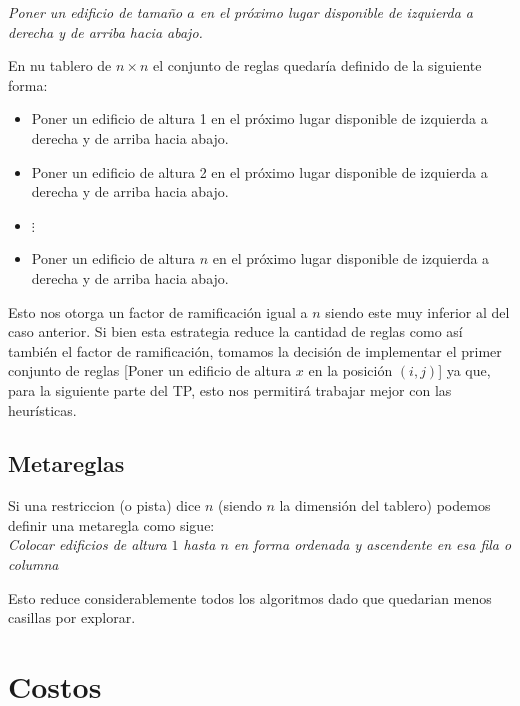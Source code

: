 \documentclass[%
	final,
	reprint,
	notitlepage,
	narroweqnarray,
	inline,
	twoside,
	invited
	]{ieee}
\begin{document}
\emph{Poner un edificio de tamaño $a$ en el próximo lugar disponible de izquierda a derecha y de arriba hacia abajo.}\\

\par En nu tablero de $n\times n$ el conjunto de reglas quedaría definido de la siguiente forma:\\

\begin{itemize}
\item Poner un edificio de altura 1 en el próximo lugar disponible de izquierda a derecha y de arriba hacia abajo.
\item Poner un edificio de altura 2 en el próximo lugar disponible de izquierda a derecha y de arriba hacia abajo.
\item $\vdots$
\item Poner un edificio de altura $n$ en el próximo lugar disponible de izquierda a derecha y de arriba hacia abajo.
\end{itemize}

\par Esto nos otorga un factor de ramificación igual a $n$ siendo este muy inferior al del caso anterior. Si bien esta estrategia reduce la cantidad de reglas como así también el factor de ramificación, tomamos la decisión de implementar el primer conjunto de reglas [Poner un edificio de altura $x$ en la posición $(i,j)$] ya que, para la siguiente parte del TP, esto nos permitirá trabajar mejor con las heurísticas.



\subsection{Metareglas}

\par Si una restriccion (o pista) dice $n$ (siendo $n$ la dimensión del tablero) podemos definir una metaregla como sigue:\\

\emph{Colocar edificios de altura $1$ hasta $n$ en forma ordenada y ascendente en esa fila o columna}\\

\par Esto reduce considerablemente todos los algoritmos dado que quedarian menos casillas por explorar.

\section{Costos}
\end{document}
